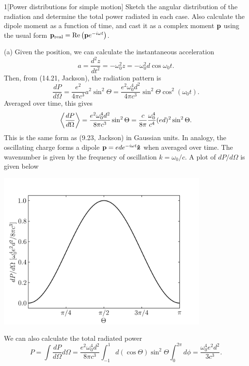 \documentclass[12pt]{article}
\begin{document}
\begin{problem}{1}[Power distributions for simple motion]
Sketch the angular distribution of the radiation and determine the total power
radiated in each case. Also calculate the dipole moment as a function of time,
and cast it as a complex moment $\vb{p}$ using the usual form
$\vb{p}_{\text{real}}=\Re\qty(\vb{p}e^{-i\omega t})$.
\begin{solution}
(a) Given the position, we can calculate the instantaneous acceleration
\begin{equation}
    a=\frac{d^2z}{dt^2}=-\omega_0^2z=-\omega_0^2d\cos\omega_0t. 
\end{equation}
Then, from (14.21, Jackson), the radiation pattern is
\begin{equation}
    \frac{dP}{d\Omega}=\frac{e^2}{4\pi c^3}a^2\sin^2\Theta
    =\frac{e^2\omega_0^4d^2}{4\pi c^3}\sin^2\Theta\cos^2(\omega_0t).
\end{equation}
Averaged over time, this gives
\begin{equation}
    \expval{\frac{dP}{d\Omega}}
    =\frac{e^2\omega_0^4d^2}{8\pi c^3}\sin^2\Theta
    =\frac{c}{8\pi}\frac{\omega_0^4}{c^4}(ed)^2\sin^2\Theta.
\end{equation}
This is the same form as (9.23, Jackson) in Gaussian units. In analogy, the
oscillating charge forms a dipole $\vb{p}=ede^{-i\omega t}\vb{\hat{z}}$ when averaged 
over time. The wavenumber is given by the frequency of oscillation
$k=\omega_0/c$. A plot of $dP/d\Omega$ is given below
\begin{center}
    \includegraphics[width=0.8\textwidth]{p1a.png} 
\end{center}
We can also calculate the total radiated power
\begin{equation}
    P=\int \frac{dP}{d\Omega}d\Omega
    =\frac{e^2\omega_0^4d^2}{8\pi c^3}\int_{-1}^1 d(\cos\Theta)\sin^2\Theta
    \int_0^{2\pi}d\phi
    =\frac{\omega_0^4e^2d^2}{3c^3}.
\end{equation}


\end{solution}
\end{problem}
\end{document}
